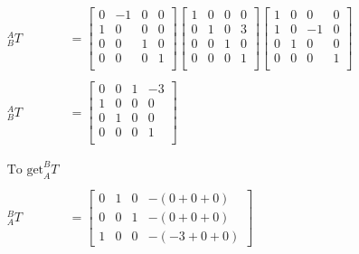 \documentclass[12pt,letterpaper]{article}
\begin{document}
$$
    \begin{aligned}
        _{B}^{A}T & =
        \begin{bmatrix}
            0 & -1 & 0 & 0
            \\
            1 & 0 & 0 & 0
            \\
            0 & 0 & 1 & 0
            \\
            0 & 0 & 0 & 1
            \\
        \end{bmatrix}
        \begin{bmatrix}
            1 & 0 & 0 & 0
            \\
            0 & 1 & 0 & 3
            \\
            0 & 0 & 1 & 0
            \\
            0 & 0 & 0 & 1
            \\
        \end{bmatrix}
        \begin{bmatrix}
            1 & 0 & 0 & 0
            \\
            1 & 0 & -1 & 0
            \\
            0 & 1 & 0 & 0
            \\
            0 & 0 & 0 & 1
            \\
        \end{bmatrix}
        \\
        \\
        _{B}^{A}T & =
        \begin{bmatrix}
            0 & 0 & 1 & -3
            \\
            1 & 0 & 0 & 0
            \\
            0 & 1 & 0 & 0
            \\
            0 & 0 & 0 & 1
            \\
        \end{bmatrix}
        \\
        \\
        \\
        \text{To get} _{A}^{B}T
        \\
        \\
        _{A}^{B}T & =
        \begin{bmatrix}
            0 & 1 & 0 & -(0 + 0 + 0)
            \\
            0 & 0 & 1 & -(0 + 0 + 0)
            \\
            1 & 0 & 0 & -(-3 + 0 + 0)

\end{bmatrix}
\end{aligned}$$
\end{document}
